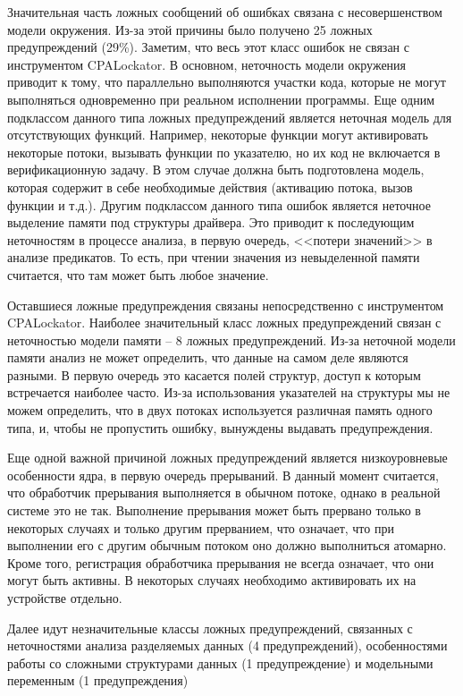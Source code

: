 Значительная часть ложных сообщений об ошибках связана с несовершенством модели окружения.
Из-за этой причины было получено 25 ложных предупреждений (29\%).
Заметим, что весь этот класс ошибок не связан с инструментом CPALockator.
В основном, неточность модели окружения приводит к тому, что параллельно выполняются участки кода, которые не могут выполняться одновременно при реальном исполнении программы.
Еще одним подклассом данного типа ложных предупреждений является неточная модель для отсутствующих функций.
Например, некоторые функции могут активировать некоторые потоки, вызывать функции по указателю, но их код не включается в верификационную задачу.
В этом случае должна быть подготовлена модель, которая содержит в себе необходимые действия (активацию потока, вызов функции и т.д.). 
Другим подклассом данного типа ошибок является неточное выделение памяти под структуры драйвера. 
Это приводит к последующим неточностям в процессе анализа, в первую очередь, <<потери значений>> в анализе предикатов.
То есть, при чтении значения из невыделенной памяти считается, что там может быть любое значение.

Оставшиеся ложные предупреждения связаны непосредственно с инструментом CPALockator.
Наиболее значительный класс ложных предупреждений связан с неточностью модели памяти -- 8 ложных предупреждений.
Из-за неточной модели памяти анализ не может определить, что данные на самом деле являются разными.
В первую очередь это касается полей структур, доступ к которым встречается наиболее часто.
Из-за использования указателей на структуры мы не можем определить, что в двух потоках используется различная память одного типа, и, чтобы не пропустить ошибку, вынуждены выдавать предупреждения.

Еще одной важной причиной ложных предупреждений является низкоуровневые особенности ядра, в первую очередь прерываний.
В данный момент считается, что обработчик прерывания выполняется в обычном потоке, однако в реальной системе это не так.
Выполнение прерывания может быть прервано только в некоторых случаях и только другим прерванием, что означает, что при выполнении его с другим обычным потоком оно должно выполниться атомарно.
Кроме того, регистрация обработчика прерывания не всегда означает, что они могут быть активны.
В некоторых случаях необходимо активировать их на устройстве отдельно.

Далее идут незначительные классы ложных предупреждений, связанных с неточностями анализа разделяемых данных (4 предупреждений), особенностями работы со сложными структурами данных (1 предупреждение) и модельными переменным (1 предупреждения)


